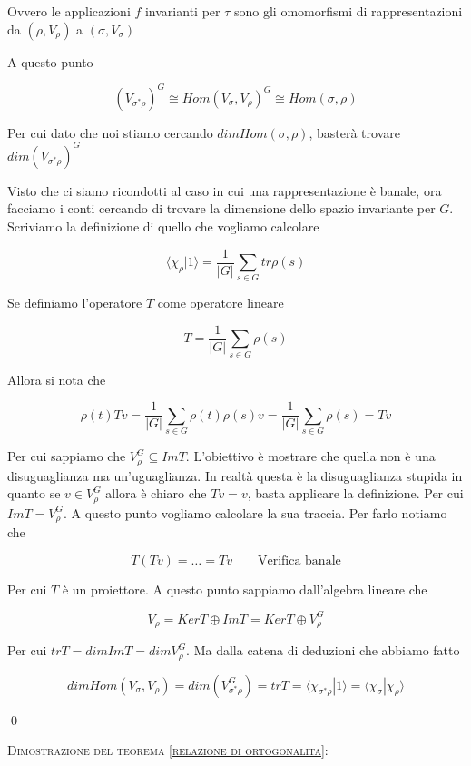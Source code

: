 \documentclass[11pt]{article}
\theoremstyle{plain}
\theoremstyle{definition}
\theoremstyle{remark}
\newcommand{\dsum}{\displaystyle\sum}
\begin{document}
Ovvero le applicazioni $f$ invarianti per $\tau $ sono gli omomorfismi di rappresentazioni da $(\rho, V_\rho) $ a $(\sigma, V_\sigma)$

A questo punto

\[ (V_{\sigma^*\rho})^G \cong Hom(V_\sigma, V_\rho)^G \cong Hom(\sigma, \rho)\]

Per cui dato che noi stiamo cercando $dimHom(\sigma, \rho)$, basterà trovare $dim(V_{\sigma^*\rho})^G$

Visto che ci siamo ricondotti al caso in cui una rappresentazione è banale, ora facciamo i conti cercando di trovare la dimensione dello spazio invariante per $G$. Scriviamo la definizione di quello che vogliamo calcolare


\[ \langle \chi_\rho | 1 \rangle = \dfrac{1}{|G|} \dsum_{s \in G} tr \rho(s)\]

Se definiamo l'operatore $T$ come operatore lineare

\[ T = \dfrac{1}{|G|} \dsum_{s\in G} \rho(s)\]


Allora si nota che 

\[ \rho(t) Tv = \dfrac{1}{|G|} \dsum_{s\in G} \rho(t)\rho(s) v = \dfrac{1}{|G|} \dsum_{s\in G} \rho(s) = Tv\]

Per cui sappiamo che $V_\rho^G \subseteq ImT$. L'obiettivo è mostrare che quella non è una disuguaglianza ma un'uguaglianza. In realtà questa è la disuguaglianza stupida in quanto se $v \in V_\rho^G$ allora è chiaro che $Tv = v$, basta applicare la definizione. Per cui $ImT = V_\rho^G$. A questo punto vogliamo calcolare la sua traccia. Per farlo notiamo che 

\[T(Tv) = \ldots = Tv \qquad \text{Verifica banale}\]

Per cui $T$ è un proiettore. A questo punto sappiamo dall'algebra lineare che

\[ V_\rho = Ker T \oplus Im T = Ker T \oplus V_\rho^G\]

Per cui $trT = dimImT = dimV_\rho^G$. Ma dalla catena di deduzioni che abbiamo fatto

\[dimHom(V_\sigma, V_\rho) = dim(V_{\sigma^*\rho}^G) = trT = \langle \chi_{\sigma^*\rho} | 1 \rangle = \langle \chi_\sigma | \chi_\rho \rangle\]

\qed














\textsc{Dimostrazione del teorema \ref{relazione di ortogonalita}:}
\end{document}
